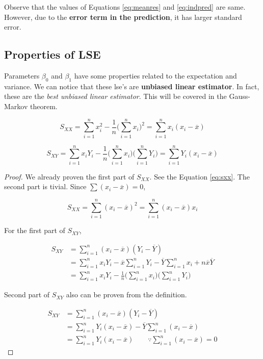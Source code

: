 \documentclass[]{book}
\theoremstyle{definition}
\theoremstyle{definition}
\theoremstyle{definition}
\theoremstyle{remark}
\let\BeginKnitrBlock\begin \let\EndKnitrBlock\end
\begin{document}
Observe that the values of Equations \eqref{eq:meanres} and
\eqref{eq:indpred} are same. However, due to the \textbf{error term in the
prediction}, it has larger standard error.

\subsection{Properties of LSE}\label{lseprop}

Parameters \(\beta_0\) and \(\beta_1\) have some properties related to
the expectation and variance. We can notice that these lse's are
\textbf{unbiased linear estimator}. In fact, these are the \emph{best
unbiased linear estimator}. This will be covered in the Gauss-Markov
theorem.

\BeginKnitrBlock{lemma}
\protect\hypertarget{lem:sxy}{}{\label{lem:sxy}
}\[S_{XX} = \sum_{i = 1}^n x_i^2 - \frac{1}{n}\bigg(\sum\limits_{i = 1}^n x_i\bigg)^2 = \sum_{i = 1}^n x_i(x_i - \overline{x})\]

\[S_{XY} = \sum_{i = 1}^n x_i Y_i - \frac{1}{n}\bigg(\sum_{i = 1}^n x_i\bigg)\bigg(\sum_{i = 1}^n Y_i\bigg) = \sum_{i = 1}^n Y_i(x_i - \overline{x})\]
\EndKnitrBlock{lemma}

\BeginKnitrBlock{proof}
\iffalse{} {Proof. } \fi{}We already proven the first part of
\(S_{XX}\). See the Equation \eqref{eq:sxx}. The second part is tivial.
Since \(\sum (x_i - \overline{x}) = 0\),

\[S_{XX} = \sum_{i = 1}^n (x_i - \overline{x})^2 = \sum_{i = 1}^n (x_i - \overline{x})x_i\]

For the first part of \(S_{XY}\),

\begin{equation*}
  \begin{split}
    S_{XY} & = \sum_{i = 1}^n (x_i - \overline{x})(Y_i - \overline{Y}) \\
    & = \sum_{i = 1}^n x_i Y_i - \overline{x} \sum_{i = 1}^n Y_i - \overline{Y} \sum_{i = 1}^n x_i + n \overline{x} \overline{Y} \\
    & = \sum_{i = 1}^n x_i Y_i - \frac{1}{n}\bigg(\sum_{i = 1}^n x_i\bigg)\bigg(\sum_{i = 1}^n Y_i\bigg)
  \end{split}
\end{equation*}

Second part of \(S_{XY}\) also can be proven from the definition.

\begin{equation*}
  \begin{split}
    S_{XY} & = \sum_{i = 1}^n (x_i - \overline{x})(Y_i - \overline{Y}) \\
    & = \sum_{i = 1}^n Y_i (x_i - \overline{x}) - \overline{Y} \sum_{i = 1}^n (x_i - \overline{x}) \\
    & = \sum_{i = 1}^n Y_i (x_i - \overline{x}) \qquad \because \sum_{i = 1}^n (x_i - \overline{x}) = 0
  \end{split}
\end{equation*}
\EndKnitrBlock{proof}
\end{document}
